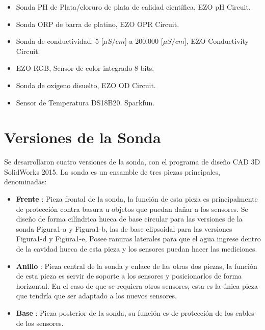 \begin{appendices}
\begin{itemize}
    \item Sonda PH de Plata/cloruro de plata de calidad científica, EZO pH Circuit.
    \item Sonda ORP de barra de platino, EZO OPR Circuit.
    \item Sonda de conductividad: 5 [\(\mu S/cm\)] a 200,000 [\(\mu S/cm\)], EZO Conductivity Circuit.
    \item EZO RGB, Sensor de color integrado 8 bits.
    \item Sonda de oxígeno disuelto, EZO OD Circuit.
    \item Sensor de Temperatura DS18B20. Sparkfun.
\end{itemize}
    
\section*{Versiones de la Sonda }
Se desarrollaron cuatro versiones de la sonda, con el programa de diseño CAD 3D SolidWorks 2015. La sonda es un ensamble de tres piezas principales, denominadas:

\begin{itemize}
\item \textbf{Frente} : Pieza frontal de la sonda, la función de esta pieza es principalmente de protección contra basura u objetos que puedan dañar a los sensores. Se dise\~no de forma cil\'indrica hueca de base circular para las versiones de la sonda Figura1-a y Figura1-b, las de base elipsoidal para las versiones Figura1-d y Figura1-e, Posee ranuras laterales para que el agua ingrese dentro de la cavidad hueca de esta pieza y los sensores puedan hacer las mediciones.  
\item \textbf{Anillo} : Pieza central de la sonda y enlace de las otras dos piezas, la función de esta pieza es servir de soporte a los sensores y posicionarlos de forma horizontal. En el caso de que se requiera otros sensores, esta es la única pieza que tendría que ser adaptado a los nuevos sensores.
\item \textbf{Base}  : Pieza posterior de la sonda, su función es de protección de los cables de los sensores. 
\end{itemize}


\end{appendices}

